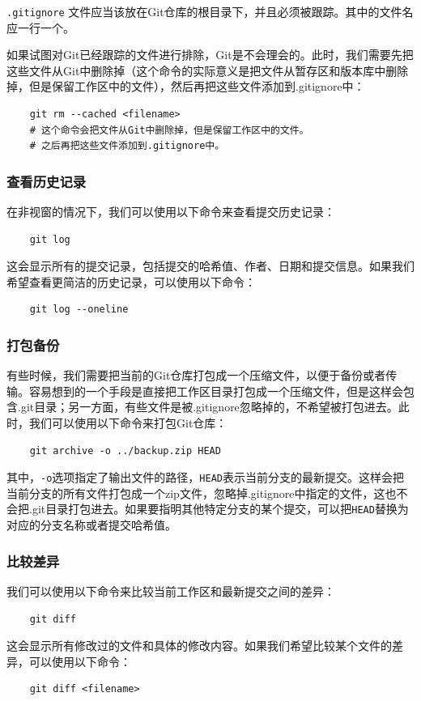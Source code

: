 \documentclass[fontset=none]{ctexart}
\begin{document}
\texttt{.gitignore} 文件应当该放在Git仓库的根目录下，并且必须被跟踪。其中的文件名应一行一个。

如果试图对Git已经跟踪的文件进行排除，Git是不会理会的。此时，我们需要先把这些文件从Git中删除掉（这个命令的实际意义是把文件从暂存区和版本库中删除掉，但是保留工作区中的文件），然后再把这些文件添加到.gitignore中：
\begin{verbatim}
    git rm --cached <filename>
    # 这个命令会把文件从Git中删除掉，但是保留工作区中的文件。
    # 之后再把这些文件添加到.gitignore中。
\end{verbatim}

\subsubsection{查看历史记录}

在非视窗的情况下，我们可以使用以下命令来查看提交历史记录：
\begin{verbatim}
    git log
\end{verbatim}
这会显示所有的提交记录，包括提交的哈希值、作者、日期和提交信息。如果我们希望查看更简洁的历史记录，可以使用以下命令：
\begin{verbatim}
    git log --oneline
\end{verbatim}

\subsubsection{打包备份}

有些时候，我们需要把当前的Git仓库打包成一个压缩文件，以便于备份或者传输。容易想到的一个手段是直接把工作区目录打包成一个压缩文件，但是这样会包含.git目录；另一方面，有些文件是被.gitignore忽略掉的，不希望被打包进去。此时，我们可以使用以下命令来打包Git仓库：

\begin{verbatim}
    git archive -o ../backup.zip HEAD
\end{verbatim}
其中，\verb|-o|选项指定了输出文件的路径，\verb|HEAD|表示当前分支的最新提交。这样会把当前分支的所有文件打包成一个zip文件，忽略掉.gitignore中指定的文件，这也不会把.git目录打包进去。如果要指明其他特定分支的某个提交，可以把\verb|HEAD|替换为对应的分支名称或者提交哈希值。

\subsubsection{比较差异}

我们可以使用以下命令来比较当前工作区和最新提交之间的差异：
\begin{verbatim}
    git diff
\end{verbatim}
这会显示所有修改过的文件和具体的修改内容。如果我们希望比较某个文件的差异，可以使用以下命令：
\begin{verbatim}
    git diff <filename>
\end{verbatim}
\end{document}

